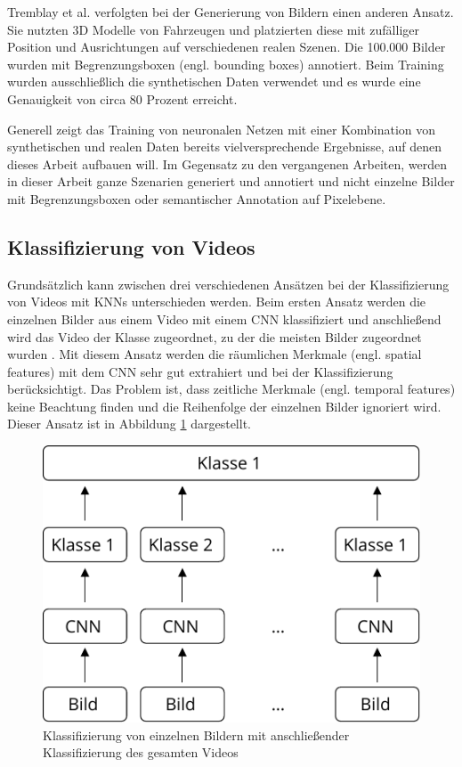 Tremblay et al. \cite{tremblay2018training} verfolgten bei der Generierung von Bildern einen anderen Ansatz. Sie nutzten 3D Modelle von Fahrzeugen und platzierten diese mit zufälliger Position und Ausrichtungen auf verschiedenen realen Szenen. Die 100.000 Bilder wurden mit Begrenzungsboxen (engl. bounding boxes) annotiert. Beim Training wurden ausschließlich die synthetischen Daten verwendet und es wurde eine Genauigkeit von circa 80 Prozent erreicht.

Generell zeigt das Training von neuronalen Netzen mit einer Kombination von synthetischen und realen Daten bereits vielversprechende Ergebnisse, auf denen dieses Arbeit aufbauen will. Im Gegensatz zu den vergangenen Arbeiten, werden in dieser Arbeit ganze Szenarien generiert und annotiert und nicht einzelne Bilder mit Begrenzungsboxen oder semantischer Annotation auf Pixelebene.


\subsection{Klassifizierung von Videos}
\label{grundlagen_nn_video}

Grundsätzlich kann zwischen drei verschiedenen Ansätzen bei der Klassifizierung von Videos mit \acp{KNN} unterschieden werden. Beim ersten Ansatz werden die einzelnen Bilder aus einem Video mit einem \ac{CNN} klassifiziert und anschließend wird das Video der Klasse zugeordnet, zu der die meisten Bilder zugeordnet wurden \cite{karpathy2014large}. Mit diesem Ansatz werden die räumlichen Merkmale (engl. spatial features) mit dem \ac{CNN} sehr gut extrahiert und bei der Klassifizierung berücksichtigt. Das Problem ist, dass zeitliche Merkmale (engl. temporal features) keine Beachtung finden und die Reihenfolge der einzelnen Bilder ignoriert wird. Dieser Ansatz ist in Abbildung \ref{fig_single_frame_classification} dargestellt.

\begin{figure}[h]
\centering
\includegraphics[scale=0.8]{images/single_frame_classification.pdf}
\caption{Klassifizierung von einzelnen Bildern mit anschließender Klassifizierung des gesamten Videos}
\label{fig_single_frame_classification}
\end{figure}

